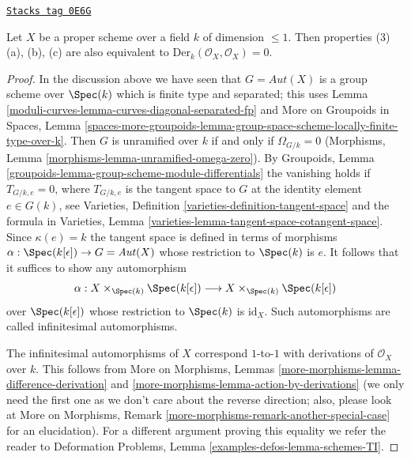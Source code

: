 \begin{lemma}
\label{moduli-curves-lemma-in-DM-locus-vector-fields}
\href{https://stacks.math.columbia.edu/tag/0E6G}{\texttt{Stacks tag 0E6G}}

Let $X$ be a proper scheme over a field $k$ of dimension $\leq 1$.
Then properties (3)(a), (b), (c) are also equivalent to
$\text{Der}_k(\mathcal{O}_X, \mathcal{O}_X) = 0$.
\end{lemma}

\begin{proof}
In the discussion above we have seen that $G = \mathit{Aut}(X)$
is a group scheme over $\Spec(k)$ which is finite type and separated;
this uses Lemma \ref{moduli-curves-lemma-curves-diagonal-separated-fp} and
More on Groupoids in Spaces, Lemma
\ref{spaces-more-groupoids-lemma-group-space-scheme-locally-finite-type-over-k}.
Then $G$ is unramified over $k$ if and only if $\Omega_{G/k} = 0$
(Morphisms, Lemma \ref{morphisms-lemma-unramified-omega-zero}).
By Groupoids, Lemma \ref{groupoids-lemma-group-scheme-module-differentials}
the vanishing holds if $T_{G/k, e} = 0$, where $T_{G/k, e}$ is the tangent
space to $G$ at the identity element $e \in G(k)$, see
Varieties, Definition \ref{varieties-definition-tangent-space}
and the formula in
Varieties, Lemma \ref{varieties-lemma-tangent-space-cotangent-space}.
Since $\kappa(e) = k$ the tangent space is defined in terms of
morphisms $\alpha : \Spec(k[\epsilon]) \to G = \mathit{Aut}(X)$
whose restriction to $\Spec(k)$ is $e$.
It follows that it suffices to show any automorphism
$$
\alpha :
X \times_{\Spec(k)} \Spec(k[\epsilon])
\longrightarrow
X \times_{\Spec(k)} \Spec(k[\epsilon])
$$
over $\Spec(k[\epsilon])$ whose restriction to $\Spec(k)$ is
$\text{id}_X$. Such automorphisms are
called infinitesimal automorphisms.

\medskip\noindent
The infinitesimal automorphisms of $X$ correspond $1$-to-$1$
with derivations of $\mathcal{O}_X$ over $k$. This follows from
More on Morphisms, Lemmas \ref{more-morphisms-lemma-difference-derivation} and
\ref{more-morphisms-lemma-action-by-derivations} (we only need the first one
as we don't care about the reverse direction; also, please look at
More on Morphisms, Remark \ref{more-morphisms-remark-another-special-case}
for an elucidation). For a different argument proving this equality
we refer the reader to
Deformation Problems, Lemma \ref{examples-defos-lemma-schemes-TI}.
\end{proof}

